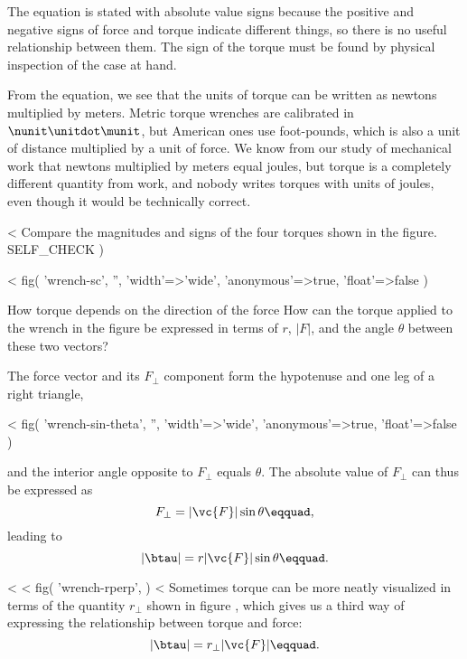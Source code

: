 The equation is stated with absolute value signs because the
positive and negative signs of force and torque indicate
different things, so there is no useful relationship between
them. The sign of the torque must be found by physical
inspection of the case at hand.

From the equation, we see that the units of torque can be
written as newtons multiplied by meters. Metric torque
wrenches are calibrated in $\nunit\unitdot\munit$, but American ones use
foot-pounds, which is also a unit of distance multiplied by
a unit of force. We know from our study of mechanical work
that newtons multiplied by meters equal joules, but torque
is a completely different quantity from work, and nobody
writes torques with units of joules, even though it would be
technically correct.

<%
Compare the magnitudes and signs of the four torques shown
in the figure.
  SELF_CHECK
  ) %

<%
  fig(
    'wrench-sc',
    '',
    {
      'width'=>'wide',
      'anonymous'=>true,
      'float'=>false
    }
  )

\begin{eg}{How torque depends on the direction of the force}
\egquestion How can the torque applied to the wrench in the
figure be expressed in terms of $r$, $|F|$, and the angle $\theta $
between these two vectors?

\eganswer The force vector and its $F_{\perp}$ component form the
hypotenuse and one leg of a right triangle,

<%
  fig(
    'wrench-sin-theta',
    '',
    {
      'width'=>'wide',
      'anonymous'=>true,
      'float'=>false
    }
  )

\noindent and the interior angle opposite to $F_{\perp}$ equals $\theta $.
The absolute value of $F_{\perp}$ can thus be expressed as
\begin{equation*}
                F_{\perp}    =    |\vc{F}| \sin  \theta\eqquad,
\end{equation*}
leading to
\begin{equation*}
                |\btau|    =    r |\vc{F}| \sin   \theta\eqquad.
\end{equation*}
\end{eg}

<%
<%
  fig(
    'wrench-rperp',
  )
<%
Sometimes torque can be more neatly visualized in terms of
the quantity $r_{\perp}$ shown in figure , which
gives us a third way of expressing the relationship
between torque and force:
\begin{equation*}
                |\btau |    =    r_{\perp} |\vc{F}|\eqquad.
\end{equation*}

